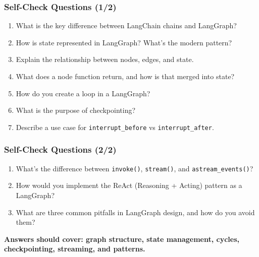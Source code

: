\documentclass[aspectratio=169,11pt]{beamer}
\begin{document}
\begin{frame}
\frametitle{Self-Check Questions (1/2)}
\begin{enumerate}
    \setlength{\itemsep}{1pt}
  \item What is the key difference between LangChain chains and LangGraph?
  \item How is state represented in LangGraph? What's the modern pattern?
  \item Explain the relationship between nodes, edges, and state.
  \item What does a node function return, and how is that merged into state?
  \item How do you create a loop in a LangGraph?
  \item What is the purpose of checkpointing?
  \item Describe a use case for \texttt{interrupt\_before} vs \texttt{interrupt\_after}.
\end{enumerate}
\end{frame}

\begin{frame}
\frametitle{Self-Check Questions (2/2)}
\begin{enumerate}
    \setlength{\itemsep}{1pt}
  \setcounter{enumi}{7}
  \item What's the difference between \texttt{invoke()}, \texttt{stream()}, and \texttt{astream\_events()}?
  \item How would you implement the ReAct (Reasoning + Acting) pattern as a LangGraph?
  \item What are three common pitfalls in LangGraph design, and how do you avoid them?
\end{enumerate}

\vspace{15pt}
\textbf{Answers should cover: graph structure, state management, cycles, checkpointing, streaming, and patterns.}
\end{frame}
\end{document}
